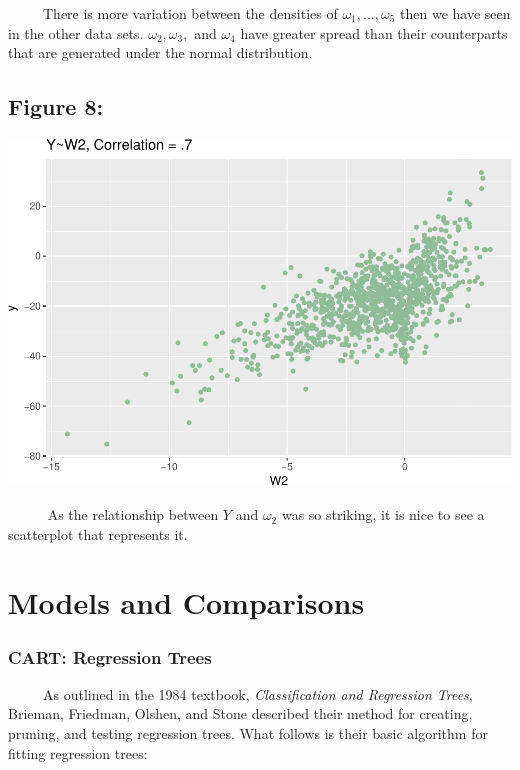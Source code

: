 \documentclass[12pt,twoside]{reedthesis}
\begin{document}
  ~~~~~There is more variation between the densities of
  \(\omega_1,...,\omega_5\) then we have seen in the other data sets.
  \(\omega_2,\omega_3,\) and \(\omega_4\) have greater spread than their
  counterparts that are generated under the normal distribution.
  
  \subsection{Figure 8:}\label{figure-8}
  
  \begin{center}\includegraphics{Thesis_files/figure-latex/unnamed-chunk-9-1} \end{center}
  
  ~~~~~ As the relationship between \(Y\) and \(\omega_2\) was so
  striking, it is nice to see a scatterplot that represents it.
  
  \section{Models and Comparisons}\label{models-and-comparisons}
  
  \subsubsection{CART: Regression Trees}\label{cart-regression-trees}
  
  ~~~~~As outlined in the 1984 textbook, \emph{Classification and
  Regression Trees}, Brieman, Friedman, Olshen, and Stone described their
  method for creating, pruning, and testing regression trees. What follows
  is their basic algorithm for fitting regression trees:
  
\end{document}
